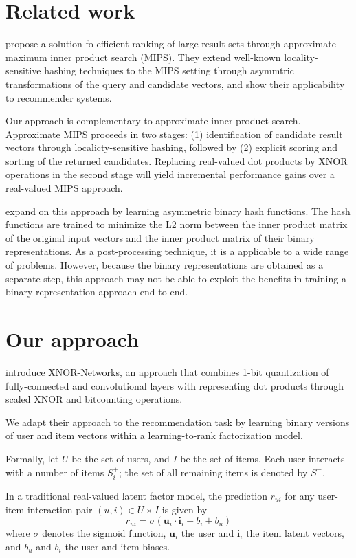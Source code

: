 \documentclass[sigconf]{acmart}
\newcommand\symUserSet{U}
\newcommand\symItemSet{I}
\newcommand\symUserInteractionSet{S}
\renewcommand\vec{\mathbf}
\begin{document}
\section{Related work}
\citet{shrivastava2014asymmetric} propose a solution fo efficient ranking of large result sets through approximate maximum inner product search (MIPS). They extend well-known \citep{indyk1998approximate} locality-sensitive hashing techniques to the MIPS setting through asymmtric transformations of the query and candidate vectors, and show their applicability to recommender systems.

Our approach is complementary to approximate inner product search. Approximate MIPS proceeds in two stages: (1) identification of candidate result vectors through localicty-sensitive hashing, followed by (2) explicit scoring and sorting of the returned candidates. Replacing real-valued dot products by XNOR operations in the second stage will yield incremental performance gains over a real-valued MIPS approach.

\citet{Shen_2015_ICCV} expand on this approach by learning asymmetric binary hash functions. The hash functions are trained to minimize the L2 norm between the inner product matrix of the original input vectors and the inner product matrix of their binary representations. As a post-processing technique, it is a applicable to a wide range of problems. However, because the binary representations are obtained as a separate step, this approach may not be able to exploit the benefits in training a binary representation approach end-to-end.

\section{Our approach}
\citet{rastegari2016xnor} introduce XNOR-Networks, an approach that combines 1-bit quantization of fully-connected and convolutional layers with representing dot products through scaled XNOR and bitcounting operations.

We adapt their approach to the recommendation task by learning binary versions of user and item vectors within a learning-to-rank factorization model.

Formally, let $\symUserSet$ be the set of users, and $\symItemSet$ be the set of items. Each user interacts with a number of items $\symUserInteractionSet_i^+$; the set of all remaining items is denoted by $\symUserInteractionSet^-$.

In a traditional real-valued latent factor model, the prediction $r_{ui}$ for any user-item interaction pair $(u, i) \in \symUserSet \times \symItemSet$ is given by
\begin{equation}
r_{ui} = \sigma(\vec{u}_i \cdot \vec{i}_i + b_i + b_u)
\end{equation}
where $\sigma$ denotes the sigmoid function, $\vec{u}_i$ the user and $\vec{i}_i$ the item latent vectors, and $b_u$ and $b_i$ the user and item biases.
\end{document}
